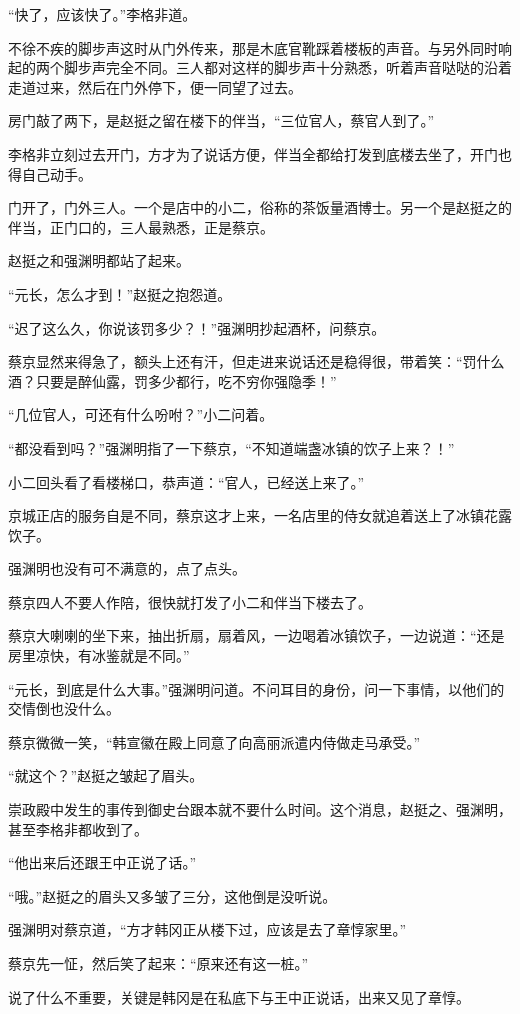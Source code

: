 “快了，应该快了。”李格非道。

不徐不疾的脚步声这时从门外传来，那是木底官靴踩着楼板的声音。与另外同时响起的两个脚步声完全不同。三人都对这样的脚步声十分熟悉，听着声音哒哒的沿着走道过来，然后在门外停下，便一同望了过去。

房门敲了两下，是赵挺之留在楼下的伴当，“三位官人，蔡官人到了。”

李格非立刻过去开门，方才为了说话方便，伴当全都给打发到底楼去坐了，开门也得自己动手。

门开了，门外三人。一个是店中的小二，俗称的茶饭量酒博士。另一个是赵挺之的伴当，正门口的，三人最熟悉，正是蔡京。

赵挺之和强渊明都站了起来。

“元长，怎么才到！”赵挺之抱怨道。

“迟了这么久，你说该罚多少？！”强渊明抄起酒杯，问蔡京。

蔡京显然来得急了，额头上还有汗，但走进来说话还是稳得很，带着笑：“罚什么酒？只要是醉仙露，罚多少都行，吃不穷你强隐季！”

“几位官人，可还有什么吩咐？”小二问着。

“都没看到吗？”强渊明指了一下蔡京，“不知道端盏冰镇的饮子上来？！”

小二回头看了看楼梯口，恭声道：“官人，已经送上来了。”

京城正店的服务自是不同，蔡京这才上来，一名店里的侍女就追着送上了冰镇花露饮子。

强渊明也没有可不满意的，点了点头。

蔡京四人不要人作陪，很快就打发了小二和伴当下楼去了。

蔡京大喇喇的坐下来，抽出折扇，扇着风，一边喝着冰镇饮子，一边说道：“还是房里凉快，有冰鉴就是不同。”

“元长，到底是什么大事。”强渊明问道。不问耳目的身份，问一下事情，以他们的交情倒也没什么。

蔡京微微一笑，“韩宣徽在殿上同意了向高丽派遣内侍做走马承受。”

“就这个？”赵挺之皱起了眉头。

崇政殿中发生的事传到御史台跟本就不要什么时间。这个消息，赵挺之、强渊明，甚至李格非都收到了。

“他出来后还跟王中正说了话。”

“哦。”赵挺之的眉头又多皱了三分，这他倒是没听说。

强渊明对蔡京道，“方才韩冈正从楼下过，应该是去了章惇家里。”

蔡京先一怔，然后笑了起来：“原来还有这一桩。”

说了什么不重要，关键是韩冈是在私底下与王中正说话，出来又见了章惇。

